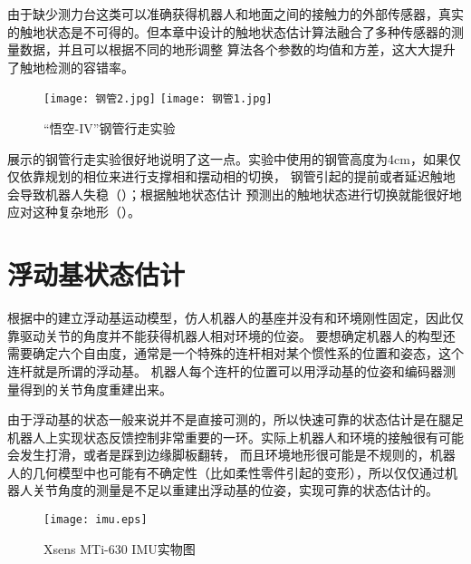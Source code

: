 由于缺少测力台这类可以准确获得机器人和地面之间的接触力的外部传感器，真实的触地状态是不可得的。但本章中设计的触地状态估计算法融合了多种传感器的测量数据，并且可以根据不同的地形调整
算法各个参数的均值和方差，这大大提升了触地检测的容错率。
\begin{figure}[htbp]
    \centering
        {%
            \texttt{[image: 钢管2.jpg]}}
    \hspace{0.5in}
        {%
            \texttt{[image: 钢管1.jpg]}}
    \caption{“悟空-IV”钢管行走实验\label{fig:harsh_ground}}
\end{figure}
展示的钢管行走实验很好地说明了这一点。实验中使用的钢管高度为4cm，如果仅仅依靠规划的相位来进行支撑相和摆动相的切换，
钢管引起的提前或者延迟触地会导致机器人失稳（）；根据触地状态估计
预测出的触地状态进行切换就能很好地应对这种复杂地形（）。

\section{浮动基状态估计}
\label{sec:com_est}
根据中的建立浮动基运动模型，仿人机器人的基座并没有和环境刚性固定，因此仅靠驱动关节的角度并不能获得机器人相对环境的位姿。
要想确定机器人的构型还需要确定六个自由度，通常是一个特殊的连杆相对某个惯性系的位置和姿态，这个连杆就是所谓的浮动基。
机器人每个连杆的位置可以用浮动基的位姿和编码器测量得到的关节角度重建出来。

由于浮动基的状态一般来说并不是直接可测的，所以快速可靠的状态估计是在腿足机器人上实现状态反馈控制非常重要的一环。实际上机器人和环境的接触很有可能会发生打滑，或者是踩到边缘脚板翻转，
而且环境地形很可能是不规则的，机器人的几何模型中也可能有不确定性（比如柔性零件引起的变形），所以仅仅通过机器人关节角度的测量是不足以重建出浮动基的位姿，实现可靠的状态估计的。
\begin{figure}[htbp]
    \centering
    \texttt{[image: imu.eps]}
    \caption{\label{fig:imu}Xsens MTi-630 IMU实物图}
\end{figure}

